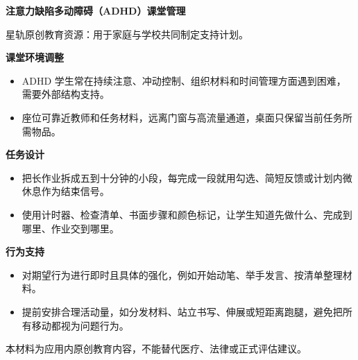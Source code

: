 \documentclass[11pt]{article}
\begin{document}
{\color[HTML]{1F5FD2}\LARGE\bfseries 注意力缺陷多动障碍（ADHD）课堂管理\par}
{\color[HTML]{667085}\small 星轨原创教育资源：用于家庭与学校共同制定支持计划。\par}
\vspace{0.8em}
{\color[HTML]{111827}\large\bfseries 课堂环境调整\par}
\begin{itemize}
\item ADHD 学生常在持续注意、冲动控制、组织材料和时间管理方面遇到困难，需要外部结构支持。
\item 座位可靠近教师和任务材料，远离门窗与高流量通道，桌面只保留当前任务所需物品。
\end{itemize}
{\color[HTML]{111827}\large\bfseries 任务设计\par}
\begin{itemize}
\item 把长作业拆成五到十分钟的小段，每完成一段就用勾选、简短反馈或计划内微休息作为结束信号。
\item 使用计时器、检查清单、书面步骤和颜色标记，让学生知道先做什么、完成到哪里、作业交到哪里。
\end{itemize}
{\color[HTML]{111827}\large\bfseries 行为支持\par}
\begin{itemize}
\item 对期望行为进行即时且具体的强化，例如开始动笔、举手发言、按清单整理材料。
\item 提前安排合理活动量，如分发材料、站立书写、伸展或短距离跑腿，避免把所有移动都视为问题行为。
\end{itemize}
\vfill
{\color[HTML]{667085}\footnotesize 本材料为应用内原创教育内容，不能替代医疗、法律或正式评估建议。\par}
\end{document}
